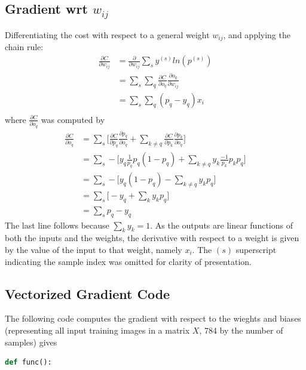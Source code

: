 \documentclass{article}
\begin{document}
   \subsection{Gradient wrt $w_{ij}$}
   Differentiating the cost with respect to a general weight $w_{ij}$, and applying
   the chain rule:
      \begin{equation*} \begin{split}
        \frac{ \partial C}{ \partial w_{ij} }
           &= \frac{ \partial }{ \partial w_{ij} } \sum_{s} y^{(s)} ln(p^{(s)}) \\
           &= \sum_s \sum_q  \frac{ \partial C}{ \partial o_q } \frac{ \partial o_q }{ \partial w_{ij} } \\
           &= \sum_s \sum_q ( p_q - y_q ) x_i \\
      \end{split} \end{equation*}
   where $ \frac{ \partial C}{ \partial o_q } $ was computed by
      \begin{equation*} \begin{split}
        \frac{ \partial C}{ \partial o_q }
           &= \sum_s \bigg[   \frac{ \partial C}{ \partial p_q } \frac{ \partial p_q}{ \partial o_q }    +   \sum_{k \neq q} \frac{ \partial C}{ \partial p_k } \frac{ \partial p_k}{ \partial o_q }  \bigg]  \\
           &= \sum_s - \bigg[    y_q \frac{1}{p_q} p_q (1 - p_q)  +   \sum_{k \neq q} y_k \frac{-1}{p_k} p_k p_q  \bigg]  \\
           &= \sum_s - \bigg[    y_q (1 - p_q)  -  \sum_{k \neq q} y_k p_q       \bigg]   \\
           &= \sum_s   \bigg[    - y_q  +  \sum_k y_k p_q   \bigg]  \\
           &= \sum_s p_q - y_q
      \end{split} \end{equation*}
   The last line follows because $\sum_k y_k = 1$.
   As the outputs are linear functions of both the inputs and the weights, the derivative
   with respect to a weight is given by the value of the input to that weight, namely $x_i$.
   The $(s)$ superscript indicating the sample index was omitted for clarity of presentation.

   \subsection{Vectorized Gradient Code}
   The following code computes the gradient with respect to the wieghts and biases
   (representing all input training images in a matrix $X$, 784 by the number of samples) gives
      \begin{lstlisting}[language=Python]
         def func():
      \end{lstlisting}
\end{document}
